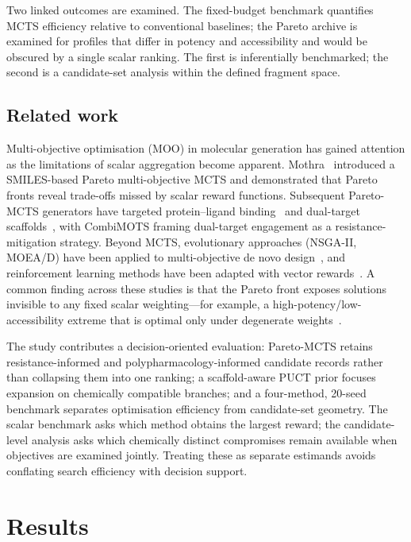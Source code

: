 \documentclass[10pt,a4paper]{article}
\begin{document}
Two linked outcomes are examined. The fixed-budget benchmark quantifies MCTS efficiency relative to conventional baselines; the Pareto archive is examined for profiles that differ in potency and accessibility and would be obscured by a single scalar ranking. The first is inferentially benchmarked; the second is a candidate-set analysis within the defined fragment space.

\subsection{Related work}

Multi-objective optimisation (MOO) in molecular generation has gained attention as the limitations of scalar aggregation become apparent. Mothra~\citep{Mothra2024} introduced a SMILES-based Pareto multi-objective MCTS and demonstrated that Pareto fronts reveal trade-offs missed by scalar reward functions. Subsequent Pareto-MCTS generators have targeted protein--ligand binding~\citep{ParetoDrug2024} and dual-target scaffolds~\citep{CombiMOTS2026}, with CombiMOTS framing dual-target engagement as a resistance-mitigation strategy. Beyond MCTS, evolutionary approaches (NSGA-II, MOEA/D) have been applied to multi-objective de novo design~\citep{Jensen2019}, and reinforcement learning methods have been adapted with vector rewards~\citep{Zhou2019}. A common finding across these studies is that the Pareto front exposes solutions invisible to any fixed scalar weighting---for example, a high-potency/low-accessibility extreme that is optimal only under degenerate weights~\citep{Zitzler2003}.

The study contributes a decision-oriented evaluation: Pareto-MCTS retains resistance-informed and polypharmacology-informed candidate records rather than collapsing them into one ranking; a scaffold-aware PUCT prior focuses expansion on chemically compatible branches; and a four-method, \num{20}-seed benchmark separates optimisation efficiency from candidate-set geometry. The scalar benchmark asks which method obtains the largest reward; the candidate-level analysis asks which chemically distinct compromises remain available when objectives are examined jointly. Treating these as separate estimands avoids conflating search efficiency with decision support.

\section{Results}
\end{document}

